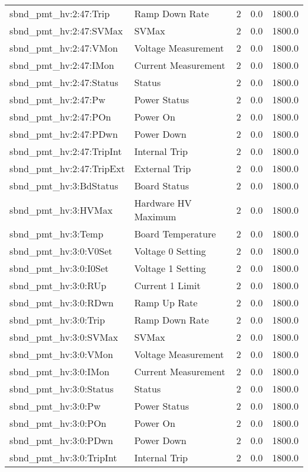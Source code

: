 \begin{center}
\begin{longtable}{l | l l l l }
sbnd\_pmt\_hv:2:47:Trip & Ramp Down Rate & 2 & 0.0 & 1800.0\\ 
sbnd\_pmt\_hv:2:47:SVMax & SVMax & 2 & 0.0 & 1800.0\\ 
sbnd\_pmt\_hv:2:47:VMon & Voltage Measurement & 2 & 0.0 & 1800.0\\ 
sbnd\_pmt\_hv:2:47:IMon & Current Measurement & 2 & 0.0 & 1800.0\\ 
sbnd\_pmt\_hv:2:47:Status & Status & 2 & 0.0 & 1800.0\\ 
sbnd\_pmt\_hv:2:47:Pw & Power Status & 2 & 0.0 & 1800.0\\ 
sbnd\_pmt\_hv:2:47:POn & Power On & 2 & 0.0 & 1800.0\\ 
sbnd\_pmt\_hv:2:47:PDwn & Power Down & 2 & 0.0 & 1800.0\\ 
sbnd\_pmt\_hv:2:47:TripInt & Internal Trip & 2 & 0.0 & 1800.0\\ 
sbnd\_pmt\_hv:2:47:TripExt & External Trip & 2 & 0.0 & 1800.0\\ 
sbnd\_pmt\_hv:3:BdStatus & Board Status & 2 & 0.0 & 1800.0\\ 
sbnd\_pmt\_hv:3:HVMax & Hardware HV Maximum & 2 & 0.0 & 1800.0\\ 
sbnd\_pmt\_hv:3:Temp & Board Temperature & 2 & 0.0 & 1800.0\\ 
sbnd\_pmt\_hv:3:0:V0Set & Voltage 0 Setting & 2 & 0.0 & 1800.0\\ 
sbnd\_pmt\_hv:3:0:I0Set & Voltage 1 Setting & 2 & 0.0 & 1800.0\\ 
sbnd\_pmt\_hv:3:0:RUp & Current 1 Limit & 2 & 0.0 & 1800.0\\ 
sbnd\_pmt\_hv:3:0:RDwn & Ramp Up Rate & 2 & 0.0 & 1800.0\\ 
sbnd\_pmt\_hv:3:0:Trip & Ramp Down Rate & 2 & 0.0 & 1800.0\\ 
sbnd\_pmt\_hv:3:0:SVMax & SVMax & 2 & 0.0 & 1800.0\\ 
sbnd\_pmt\_hv:3:0:VMon & Voltage Measurement & 2 & 0.0 & 1800.0\\ 
sbnd\_pmt\_hv:3:0:IMon & Current Measurement & 2 & 0.0 & 1800.0\\ 
sbnd\_pmt\_hv:3:0:Status & Status & 2 & 0.0 & 1800.0\\ 
sbnd\_pmt\_hv:3:0:Pw & Power Status & 2 & 0.0 & 1800.0\\ 
sbnd\_pmt\_hv:3:0:POn & Power On & 2 & 0.0 & 1800.0\\ 
sbnd\_pmt\_hv:3:0:PDwn & Power Down & 2 & 0.0 & 1800.0\\ 
sbnd\_pmt\_hv:3:0:TripInt & Internal Trip & 2 & 0.0 & 1800.0\\ 

\end{longtable}
\end{center}

